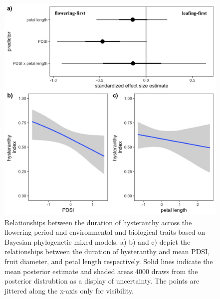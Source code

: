 \documentclass{article}[12pt]
\begin{document}
{\begin{figure}[h!]
    \centering
 \includegraphics[width=\textwidth]{..//..//Plots/whatReviwerswant/hypoth_preds.jpeg}
    \caption{Relationships between the duration of hysteranthy across the flowering period and environmental and biological traits based on Bayesian phylogenetic mixed models. a) b) and c) depict the relationships between the duration of hysteranthy and mean PDSI, fruit diameter, and petal length respectively. Solid lines indicate the mean posterior estimate and shaded areas 4000 draws from the posterior distrubtion as a display of uncertainty. The points are jittered along the x-axis only for visibility.}
    \label{fig:prunes}
\end{figure}


}
\end{document}
